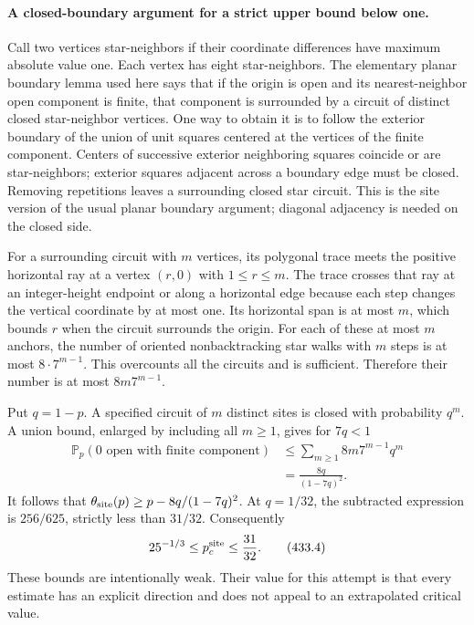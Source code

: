 \documentclass[11pt]{article}
\begin{document}
\paragraph{A closed-boundary argument for a strict upper bound below one.}
Call two vertices star-neighbors if their coordinate differences have maximum absolute value one. Each vertex has eight star-neighbors. The elementary planar boundary lemma used here says that if the origin is open and its nearest-neighbor open component is finite, that component is surrounded by a circuit of distinct closed star-neighbor vertices. One way to obtain it is to follow the exterior boundary of the union of unit squares centered at the vertices of the finite component. Centers of successive exterior neighboring squares coincide or are star-neighbors; exterior squares adjacent across a boundary edge must be closed. Removing repetitions leaves a surrounding closed star circuit. This is the site version of the usual planar boundary argument; diagonal adjacency is needed on the closed side.

For a surrounding circuit with $m$ vertices, its polygonal trace meets the positive horizontal ray at a vertex $(r,0)$ with $1\le r\le m$. The trace crosses that ray at an integer-height endpoint or along a horizontal edge because each step changes the vertical coordinate by at most one. Its horizontal span is at most $m$, which bounds $r$ when the circuit surrounds the origin. For each of these at most $m$ anchors, the number of oriented nonbacktracking star walks with $m$ steps is at most $8\cdot7^{m-1}$. This overcounts all the circuits and is sufficient. Therefore their number is at most $8m7^{m-1}$.

Put $q=1-p$. A specified circuit of $m$ distinct sites is closed with probability $q^m$. A union bound, enlarged by including all $m\ge1$, gives for $7q<1$
\[
 \begin{split}
 \mathbb P_p(0\text{ open with finite component})
 &\le\sum_{m\ge1}8m7^{m-1}q^m\\
 &=\frac{8q}{(1-7q)^2}.
 \end{split} \tag{433.3}
\]
It follows that $\theta_{\rm site}(p)\ge p-8q/(1-7q)^2$. At $q=1/32$, the subtracted expression is $256/625$, strictly less than $31/32$. Consequently
\[
 25^{-1/3}\le p_c^{\rm site}\le\frac{31}{32}. \tag{433.4}
\]
These bounds are intentionally weak. Their value for this attempt is that every estimate has an explicit direction and does not appeal to an extrapolated critical value.
\end{document}
